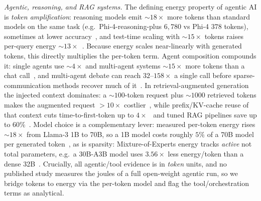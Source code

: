 \documentclass[journal]{IEEEtran}
\newcommand{\reasoningBlow}{$\sim\!18\times$}  %
\newcommand{\multiagentx}{$\sim\!15\times$}    %
\begin{document}
\textit{Agentic, reasoning, and RAG systems.} The defining energy property of agentic AI is
\emph{token amplification}: reasoning models emit \reasoningBlow{} more tokens than standard models on
the same task (e.g.\ Phi-4-reasoning-plus $6{,}780$ vs Phi-4 $378$ tokens), sometimes at lower
accuracy~\cite{llmthinkbench2025}, and test-time scaling with $\sim\!15\times$ tokens raises per-query
energy $\sim\!13\times$~\cite{oviedo2026joule}. Because energy scales near-linearly with generated
tokens, this directly multiplies the per-token term. Agent composition compounds it: single agents
use $\sim\!4\times$ and multi-agent systems \multiagentx{} more tokens than a chat
call~\cite{anthropic_multiagent}, and multi-agent debate can reach $32$--$158\times$ a single call
before sparse-communication methods recover much of it~\cite{s2mad2025}. In retrieval-augmented
generation the injected context dominates: a $\sim\!100$-token request plus $\sim\!1000$ retrieved
tokens makes the augmented request $>\!10\times$ costlier~\cite{ragcache2024}, while prefix/KV-cache
reuse of that context cuts time-to-first-token up to $4\times$~\cite{ragcache2024} and tuned RAG
pipelines save up to $60\%$~\cite{ragenergy2026}.
Model choice is a complementary lever: measured per-token energy rises
$\sim\!18\times$ from Llama-3 1B to 70B, so a 1B model costs roughly $5\%$
of a 70B model per generated token~\cite{tokenpowerbench2026},
as is sparsity: Mixture-of-Experts
energy tracks \emph{active} not total parameters, e.g.\ a 30B-A3B model uses $3.56\times$ less
energy/token than a dense 32B~\cite{mlenergy_v3}. Crucially, all agentic/tool evidence is in
\emph{token} units, and no published study measures the joules of a full open-weight agentic run,
so we bridge tokens to energy via the per-token model and flag the tool/orchestration terms as
analytical.
\end{document}
